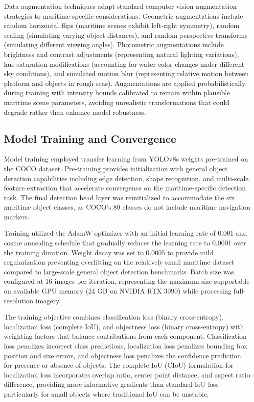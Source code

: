\documentclass{erauthesis}
\begin{document}
Data augmentation techniques adapt standard computer vision augmentation strategies to maritime-specific considerations.
Geometric augmentations include random horizontal flips (maritime scenes exhibit left-right symmetry), random scaling (simulating varying object distances), and random perspective transforms (simulating different viewing angles).
Photometric augmentations include brightness and contrast adjustments (representing natural lighting variations), hue-saturation modifications (accounting for water color changes under different sky conditions), and simulated motion blur (representing relative motion between platform and objects in rough seas).
Augmentations are applied probabilistically during training with intensity bounds calibrated to remain within plausible maritime scene parameters, avoiding unrealistic transformations that could degrade rather than enhance model robustness.

\subsection{Model Training and Convergence} \label{sec:yolo_training convrg}

Model training employed transfer learning from YOLOv8s weights pre-trained on the COCO dataset.
Pre-training provides initialization with general object detection capabilities including edge detection, shape recognition, and multi-scale feature extraction that accelerate convergence on the maritime-specific detection task.
The final detection head layer was reinitialized to accommodate the six maritime object classes, as COCO's 80 classes do not include maritime navigation markers.

Training utilized the AdamW optimizer with an initial learning rate of 0.001 and cosine annealing schedule that gradually reduces the learning rate to 0.0001 over the training duration.
Weight decay was set to 0.0005 to provide mild regularization preventing overfitting on the relatively small maritime dataset compared to large-scale general object detection benchmarks.
Batch size was configured at 16 images per iteration, representing the maximum size supportable on available GPU memory (24 GB on NVIDIA RTX 3090) while processing full-resolution imagery.

The training objective combines classification loss (binary cross-entropy), localization loss (complete IoU), and objectness loss (binary cross-entropy) with weighting factors that balance contributions from each component.
Classification loss penalizes incorrect class predictions, localization loss penalizes bounding box position and size errors, and objectness loss penalizes the confidence prediction for presence or absence of objects.
The complete IoU (CIoU) formulation for localization loss incorporates overlap ratio, center point distance, and aspect ratio difference, providing more informative gradients than standard IoU loss particularly for small objects where traditional IoU can be unstable.
\end{document}
